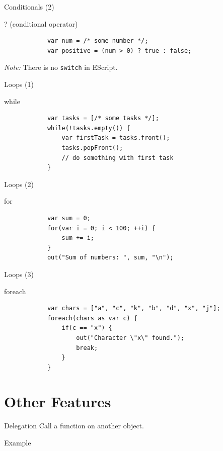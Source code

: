 \documentclass[ucs,9pt]{beamer}
\begin{document}
\begin{frame}[fragile]{Conditionals (2)}
	\begin{block}{? (conditional operator)}
		\begin{lstlisting}
			var num = /* some number */;
			var positive = (num > 0) ? true : false;
		\end{lstlisting}
	\end{block}
	\pause
	\vfill
	\emph{Note:} There is no \lstinline!switch! in EScript.
\end{frame}

\begin{frame}[fragile]{Loops (1)}
	\begin{block}{while}
		\begin{lstlisting}
			var tasks = [/* some tasks */];
			while(!tasks.empty()) {
			    var firstTask = tasks.front();
			    tasks.popFront();
			    // do something with first task
			}
		\end{lstlisting}
	\end{block}
\end{frame}

\begin{frame}[fragile]{Loops (2)}
	\begin{block}{for}
		\begin{lstlisting}
			var sum = 0;
			for(var i = 0; i < 100; ++i) {
			    sum += i;
			}
			out("Sum of numbers: ", sum, "\n");
		\end{lstlisting}
	\end{block}
\end{frame}

\begin{frame}[fragile]{Loops (3)}
	\begin{block}{foreach}
		\begin{lstlisting}
			var chars = ["a", "c", "k", "b", "d", "x", "j"];
			foreach(chars as var c) {
			    if(c == "x") {
			        out("Character \"x\" found.");
			        break;
			    }
			}
		\end{lstlisting}
	\end{block}
\end{frame}

\section{Other Features}
\begin{frame}{Delegation}
	Call a function on another object.
	\begin{block}{Example}
		
	\end{block}
\end{frame}
\end{document}
